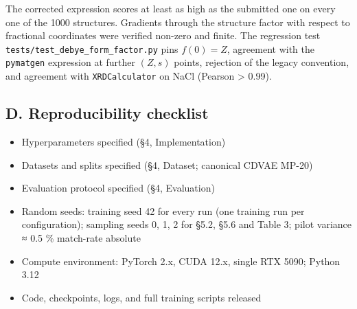 \documentclass[
  11pt,
]{article}
\providecommand{\tightlist}{%
  \setlength{\itemsep}{0pt}\setlength{\parskip}{0pt}}
\begin{document}
The corrected expression scores at least as high as the submitted one on
every one of the 1000 structures. Gradients through the structure factor
with respect to fractional coordinates were verified non-zero and
finite. The regression test \texttt{tests/test\_debye\_form\_factor.py}
pins \(f(0) = Z\), agreement with the \texttt{pymatgen} expression at
further \((Z, s)\) points, rejection of the legacy convention, and
agreement with \texttt{XRDCalculator} on NaCl (Pearson \textgreater{}
0.99).

\subsection{D. Reproducibility
checklist}\label{d.-reproducibility-checklist}

\begin{itemize}
\tightlist
\item[$\boxtimes$]
  Hyperparameters specified (§4, Implementation)
\item[$\boxtimes$]
  Datasets and splits specified (§4, Dataset; canonical CDVAE MP-20)
\item[$\boxtimes$]
  Evaluation protocol specified (§4, Evaluation)
\item[$\boxtimes$]
  Random seeds: training seed 42 for every run (one training run per
  configuration); sampling seeds 0, 1, 2 for §5.2, §5.6 and Table 3;
  pilot variance ≈ 0.5 \% match-rate absolute
\item[$\boxtimes$]
  Compute environment: PyTorch 2.x, CUDA 12.x, single RTX 5090; Python
  3.12
\item[$\boxtimes$]
  Code, checkpoints, logs, and full training scripts released
\end{itemize}
\end{document}
